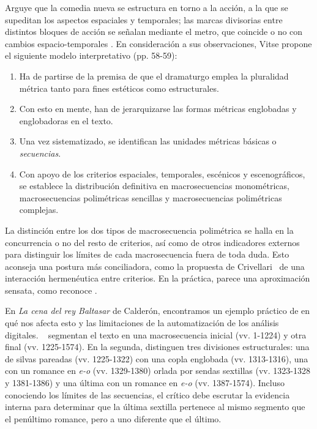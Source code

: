 Arguye que la comedia nueva se estructura en torno a la acción, a la que se supeditan los aspectos espaciales y temporales; las marcas divisorias entre distintos bloques de acción se señalan mediante el metro, que coincide o no con cambios espacio-temporales \parencite[55]{vitse1998}. En consideración a sus observaciones, Vitse propone el siguiente modelo interpretativo (pp. 58-59):

\begin{enumerate}
	\item Ha de partirse de la premisa de que el dramaturgo emplea la pluralidad métrica tanto para fines estéticos como estructurales.
	\item Con esto en mente, han de jerarquizarse las formas métricas englobadas y englobadoras en el texto.
	\item Una vez sistematizado, se identifican las unidades métricas básicas o \textit{secuencias}.
	\item Con apoyo de los criterios espaciales, temporales, escénicos y escenográficos, se establece la distribución definitiva en macrosecuencias monométricas, macrosecuencias polimétricas sencillas y macrosecuencias polimétricas complejas.
\end{enumerate}


La distinción entre los dos tipos de macrosecuencia polimétrica se halla en la concurrencia o no del resto de criterios, así como de otros indicadores externos para distinguir los límites de cada macrosecuencia fuera de toda duda. Esto aconseja una postura más conciliadora, como la propuesta de Crivellari~\parencite*[82]{crivellari2013} de una interacción hermenéutica entre criterios. En la práctica, parece una aproximación sensata, como reconoce  \parencites[38-46]{casariego2018}.

En \textit{La cena del rey Baltasar} de Calderón\nocite{calderon_baltasar}, encontramos un ejemplo práctico de en qué nos afecta esto y las limitaciones de la automatización de los análisis digitales. \citeauthor{sanchez2013}~\parencite*[39-54]{sanchez2013} segmentan el texto en una macrosecuencia inicial (vv. 1-1224) y otra final (vv. 1225-1574). En la segunda, distinguen tres divisiones estructurales: una de silvas pareadas (vv. 1225-1322) con una copla englobada (vv. 1313-1316), una con un romance en \textit{e-o} (vv. 1329-1380) orlada por sendas sextillas (vv. 1323-1328 y 1381-1386) y una última con un romance en \textit{e-o} (vv. 1387-1574). Incluso conociendo los límites de las secuencias, el crítico debe escrutar la evidencia interna para determinar que la última sextilla pertenece al mismo segmento que el penúltimo romance, pero a uno diferente que el último.

